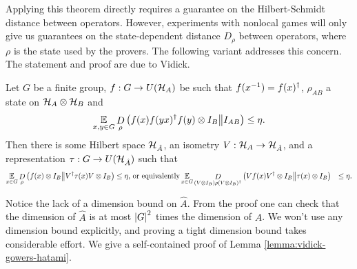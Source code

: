 Applying this theorem directly requires a guarantee on the Hilbert-Schmidt distance between operators. However, experiments with nonlocal games will only give us guarantees on the state-dependent distance $D_\rho$ between operators, where $\rho$ is the state used by the provers. The following variant addresses this concern. The statement and proof are due to Vidick.
\begin{lemma}\label{lemma:vidick-gowers-hatami}
	Let $G$ be a finite group, $f: G \to U(\mathcal H_A)$ be such that $f(x^{-1}) = f(x)^\dagger$, $\rho_{AB}$ a state on $\mathcal H_A\otimes \mathcal H_B$  and
	\begin{equation}
		\operatorname*{\mathbb E}\limits_{x,y\in G}\mathop{D}\limits_{\rho}\left(f(x)f(yx)^\dagger f(y)\otimes I_B\middle\| I_{AB}\right) \leq \eta.
	\end{equation}
	Then there is some Hilbert space $\mathcal H_{\hat A}$, an isometry $V: \mathcal H_A\to \mathcal H_{\hat A}$, and a representation $\tau: G\to U(\mathcal H_{\hat A})$ such that
	\begin{align}
		\operatorname*{\mathbb E}\limits_{x\in G} \mathop{D}\limits_{\rho}\left(f(x)\otimes I_B\middle\|  V^\dagger \tau(x)V\otimes I_B\right) 
		&\leq \eta\text{, or equivalently}
		\operatorname*{\mathbb E}\limits_{x\in G} \mathop{D}\limits_{(V\otimes I_B)\rho (V\otimes I_B)^\dagger}\left(Vf(x)V^\dagger\otimes I_B\middle\| \tau(x)\otimes I_B\right) 
		&\leq \eta.
	\end{align}
\end{lemma}

\noindent
Notice the lack of a dimension bound on $\hat A$. From the proof one can check that the dimension of $\hat A$ is at most $\left\vert G\right\vert^2$ times the dimension of $A$. We won't use any dimension bound explicitly, and proving a tight dimension bound takes considerable effort. 
We give a self-contained proof of Lemma \ref{lemma:vidick-gowers-hatami}. 

